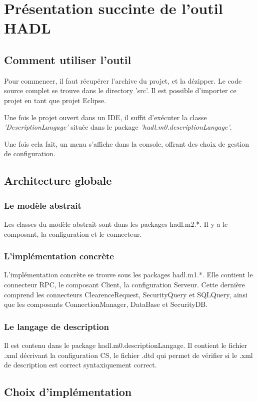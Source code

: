 \chapter{Présentation succinte de l'outil HADL}

\section{Comment utiliser l'outil}

Pour commencer, il faut récupérer l'archive du projet, et la dézipper. Le code source complet se trouve dans le directory 'src'.
Il est possible d'importer ce projet en tant que projet Eclipse.

Une fois le projet ouvert dans un IDE, il suffit d'exécuter la classe
\emph{'DescriptionLangage'} située dans le package
\emph{'hadl.m0.descriptionLangage'}.

Une fois cela fait, un menu s'affiche dans la console, offrant des choix de
gestion de configuration.

\section{Architecture globale}
\subsection{Le modèle abstrait}
Les classes du modèle abstrait sont dans les packages hadl.m2.*. Il y a le
composant, la configuration et le connecteur.
\subsection{L'implémentation concrète}
L'implémentation concrète se trouve sous les packages hadl.m1.*. Elle contient
le connecteur RPC, le composant Client, la configuration Serveur. Cette dernière
comprend les connecteurs ClearenceRequest, SecurityQuery et SQLQuery, ainsi que
les composants ConnectionManager, DataBase et SecurityDB.
\subsection{Le langage de description}
Il est contenu dans le package hadl.m0.descriptionLangage. Il contient le
fichier .xml décrivant la configuration CS, le fichier .dtd qui permet de
vérifier si le .xml de description est correct syntaxiquement correct.

\section{Choix d'implémentation}
